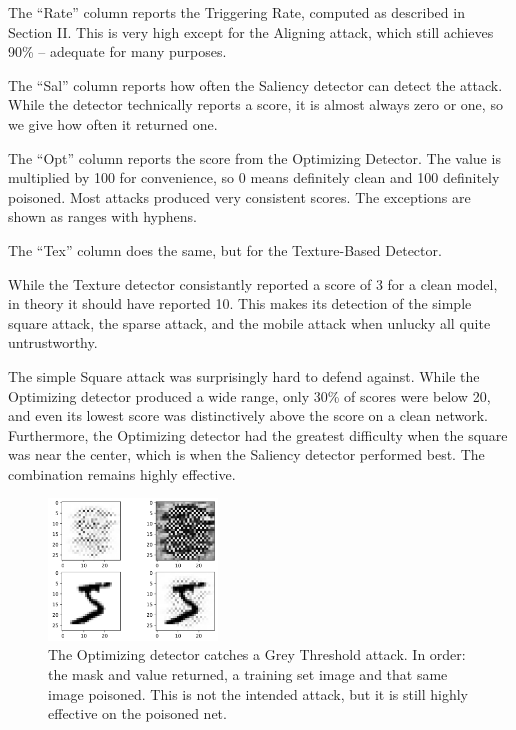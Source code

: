 \documentclass[letterpaper, 10 pt, conference]{ieeeconf}  %
\begin{document}
The ``Rate'' column reports the Triggering Rate, computed as described
in Section II.  This is very high except for the Aligning attack,
which still achieves 90\% -- adequate for many purposes.

The ``Sal'' column reports how often the Saliency detector can
detect the attack.  While the detector technically reports a score, it
is almost always zero or one, so we give how often it returned one.

The ``Opt'' column reports the score from the Optimizing
Detector.  The value is multiplied by 100 for convenience, so 0 means
definitely clean and 100 definitely poisoned.  Most attacks produced
very consistent scores.  The exceptions are shown as ranges with
hyphens.

The ``Tex'' column does the same, but for the Texture-Based
Detector.

While the Texture detector consistantly reported a score of 3 for a
clean model, in theory it should have reported 10.  This makes its
detection of the simple square attack, the sparse attack, and the
mobile attack when unlucky all quite untrustworthy.

The simple Square attack was surprisingly hard to defend against.
While the Optimizing detector produced a wide range, only 30\% of
scores were below 20, and even its lowest score was distinctively
above the score on a clean network.  Furthermore, the Optimizing
detector had the greatest difficulty when the square was near the
center, which is when the Saliency detector performed best.  The
combination remains highly effective.

\begin{figure}[b]
\centering
\includegraphics[width=0.4\textwidth]{catch_grey.png}
\caption{The Optimizing detector catches a Grey Threshold attack.  In
  order: the mask and value returned, a training set image and that
  same image poisoned.  This is not the intended attack, but it is
  still highly effective on the poisoned net.}
\label{catchgrey}
\end{figure}
\end{document}
